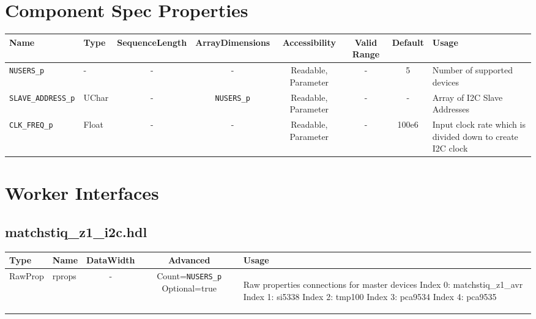 \documentclass{article}
\def\comp{matchstiq\_z1\_i2c}
\begin{document}
\begin{landscape}
\section*{Component Spec Properties}
	\begin{scriptsize}
		\begin{tabular}{|p{3cm}|p{1.5cm}|c|c|c|c|c|p{7cm}|}
			\hline
			\rowcolor{blue}
			Name                   & Type   & SequenceLength & ArrayDimensions & Accessibility       & Valid Range & Default & Usage                        \\
			\hline
			\verb+NUSERS_p+        & -      & -              & -               & Readable, Parameter & -           & 5       & Number of supported devices     \\
			\hline
			\verb+SLAVE_ADDRESS_p+ & UChar  & -              & \verb+NUSERS_p+ & Readable, Parameter & -           & -       & Array of I2C Slave Addresses \\
			\hline
			\verb+CLK_FREQ_p+       & Float & -              & -               & Readable, Parameter & -           & 100e6 & Input clock rate which is divided down to create I2C clock  \\
			\hline
		\end{tabular}
	\end{scriptsize}

	\section*{Worker Interfaces}
	\subsection*{\comp.hdl}
	\begin{scriptsize}
		\begin{tabular}{|M{2cm}|M{1.5cm}|c|c|M{6cm}|}
			\hline
			\rowcolor{blue}
			Type & Name & DataWidth & Advanced & Usage \\
			\hline
			RawProp
			& rprops
			& -
			& Count=\verb+NUSERS_p+ Optional=true
			& \begin{flushleft}Raw properties connections for master devices \newline Index 0: matchstiq\_z1\_avr \newline Index 1: si5338 \newline Index 2: tmp100 \newline Index 3: pca9534 \newline Index 4: pca9535 \end{flushleft}\\
			\hline
		\end{tabular}
	\end{scriptsize}


\end{landscape}
\end{document}
